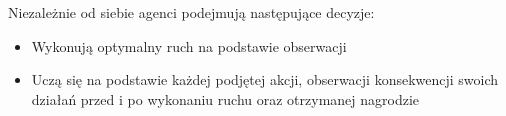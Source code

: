 Niezależnie od siebie agenci podejmują następujące decyzje:
\begin{itemize}
    \item Wykonują optymalny ruch na podstawie obserwacji
    \item Uczą się na podstawie każdej podjętej akcji, obserwacji konsekwencji swoich działań 
          przed i po wykonaniu ruchu oraz otrzymanej nagrodzie
\end{itemize}



